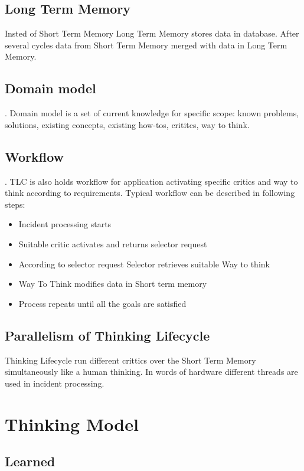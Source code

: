 \documentclass{llncs}
\begin{document}
\subsection{Long Term Memory}
Insted of Short Term Memory Long Term Memory stores data in database. After several cycles data from Short Term Memory merged with data in Long Term Memory. 

\subsection{Domain model}. Domain model is a set of current knowledge for specific scope: known problems, solutions, existing concepts, existing how-tos, crititcs, way to think.\\

\subsection{Workflow}. TLC is also holds workflow for application activating specific critics and way to think according to requirements. Typical workflow can be described in following steps:

\begin{itemize}
 \item Incident processing starts
 \item Suitable critic activates and returns selector request
 \item According to selector request Selector retrieves suitable Way to think
 \item Way To Think modifies data in Short term memory
 \item Process repeats until all the goals are satisfied
\end{itemize}

\subsection{Parallelism of Thinking Lifecycle}
Thinking Lifecycle run different crittics over the Short Term Memory simultaneously like a human thinking. In words of hardware different threads are used in incident processing. 

\section{Thinking Model}

\subsection{Learned}
\end{document}

